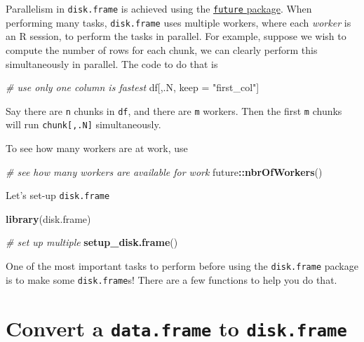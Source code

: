 \documentclass[]{book}
\newenvironment{Shaded}{\begin{snugshade}}{\end{snugshade}}
\newcommand{\CommentTok}[1]{\textcolor[rgb]{0.56,0.35,0.01}{\textit{#1}}}
\newcommand{\KeywordTok}[1]{\textcolor[rgb]{0.13,0.29,0.53}{\textbf{#1}}}
\newcommand{\NormalTok}[1]{#1}
\newcommand{\OperatorTok}[1]{\textcolor[rgb]{0.81,0.36,0.00}{\textbf{#1}}}
\newcommand{\StringTok}[1]{\textcolor[rgb]{0.31,0.60,0.02}{#1}}
\begin{document}
Parallelism in \texttt{disk.frame} is achieved using the \href{https://cran.r-project.org/package=future}{\texttt{future} package}. When performing many tasks, \texttt{disk.frame} uses multiple workers, where each \emph{worker} is an R session, to perform the tasks in parallel. For example, suppose we wish to compute the number of rows for each chunk, we can clearly perform this simultaneously in parallel. The code to do that is

\begin{Shaded}
\begin{Highlighting}[]
\CommentTok{# use only one column is fastest}
\NormalTok{df[,.N, keep =}\StringTok{ "first_col"}\NormalTok{]}
\end{Highlighting}
\end{Shaded}

Say there are \texttt{n} chunks in \texttt{df}, and there are \texttt{m} workers. Then the first \texttt{m} chunks will run \texttt{chunk{[},.N{]}} simultaneously.

To see how many workers are at work, use

\begin{Shaded}
\begin{Highlighting}[]
\CommentTok{# see how many workers are available for work}
\NormalTok{future}\OperatorTok{::}\KeywordTok{nbrOfWorkers}\NormalTok{()}
\end{Highlighting}
\end{Shaded}

Let's set-up \texttt{disk.frame}

\begin{Shaded}
\begin{Highlighting}[]
\KeywordTok{library}\NormalTok{(disk.frame)}

\CommentTok{# set up multiple}
\KeywordTok{setup_disk.frame}\NormalTok{()}
\end{Highlighting}
\end{Shaded}

One of the most important tasks to perform before using the \texttt{disk.frame} package is to make some \texttt{disk.frame}s! There are a few functions to help you do that.

\hypertarget{convert-a-data.frame-to-disk.frame}{%
\section{\texorpdfstring{Convert a \texttt{data.frame} to \texttt{disk.frame}}{Convert a data.frame to disk.frame}}\label{convert-a-data.frame-to-disk.frame}}
\end{document}
